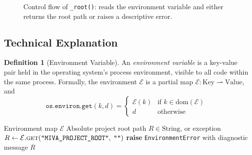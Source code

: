 \documentclass[12pt,a4paper]{article}
\theoremstyle{definition}
\newtheorem{definition}[theorem]{Definition}
\theoremstyle{remark}
\begin{document}
\begin{figure}[H]
\centering
{}
\caption{Control flow of \texttt{\_root()}: reads the environment variable
and either returns the root path or raises a descriptive error.}
\label{fig:root_flow}
\end{figure}

\subsection{Technical Explanation}

\begin{definition}[Environment Variable]
An \emph{environment variable} is a key-value pair held in the operating
system's process environment, visible to all code within the same process.
Formally, the environment $\mathcal{E}$ is a partial map
$\mathcal{E}: \text{Key} \rightharpoonup \text{Value}$, and
\[
  \texttt{os.environ.get}(k, d) =
  \begin{cases}
    \mathcal{E}(k) & \text{if } k \in \text{dom}(\mathcal{E}) \\
    d              & \text{otherwise}
  \end{cases}
\]
\end{definition}

\begin{algorithm}[H]
\caption{\texttt{\_root()} — Environment Root Resolution}
\label{alg:root}
\begin{algorithmic}[1]
\Require Environment map $\mathcal{E}$
\Ensure Absolute project root path $R \in \text{String}$, or exception
\State $R \gets \mathcal{E}.\textsc{get}(\texttt{"MIVA\_PROJECT\_ROOT"},\; \texttt{""})$
  \State \textbf{raise} \texttt{EnvironmentError} with diagnostic message
\EndIf
\State \Return $R$
\end{algorithmic}
\end{algorithm}
\end{document}
